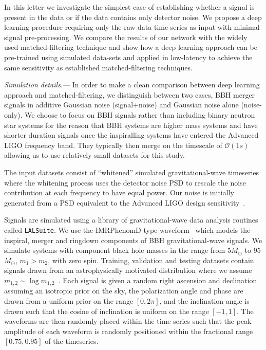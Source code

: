 \documentclass[%
showpacs,
 amsmath,amssymb,
 aps,
 twocolumn,
 prl,
 reprint,
floatfix,
]{revtex4-1}
\begin{document}
%
%
In this letter we investigate the simplest case of establishing whether a
signal is present in the data or if the data contains only detector noise. We
propose a deep learning procedure requiring only the raw data time series as
input with minimal signal pre-processing. We compare the results of our network
with the widely used matched-filtering technique and show how a deep learning
approach can be pre-trained using simulated data-sets and applied in
low-latency to achieve the same sensitivity as established matched-filtering
techniques. 

%
%
\textit{Simulation details.}--- 
%
%
In order to make a clean comparison between deep learning approach and
matched-filtering, we distinguish between two cases, \ac{BBH} merger
signals in additive Gaussian noise (signal+noise) and Gaussian noise alone
(noise-only). We choose to focus on \ac{BBH} signals rather than including
binary neutron star systems for the reason that \ac{BBH} systems are higher
mass systems and have shorter duration signals once the inspiralling systems
have entered the Advanced LIGO frequency band. They typically then merge on the
timescale of $\mathcal{O}(1 s)$ allowing us to use relatively small datasets
for this study. 

%
%
The input datasets consist of ``whitened'' simulated gravitational-wave
timeseries where the whitening process uses the detector noise \ac{PSD} to  
rescale the noise contribution at each frequency to have equal power. 
Our noise is initially generated from a \ac{PSD} equivalent to the Advanced
LIGO design sensitivity~\cite{2016LRR....19....1A}. 

%
%
Signals are simulated using a library of gravitational-wave data analysis
routines called \texttt{LALSuite}. We use the IMRPhenomD type
waveform~\cite{PhysRevD.93.04006, PhysRevD.93.044007} which models the
inspiral, merger and ringdown components of \ac{BBH} gravitational-wave
signals. We simulate systems with component black hole masses in the range from
5\(M_\odot\) to 95\(M_\odot\), $m_{1} > m_{2}$, with zero spin.
Training, validation and testing datasets contain signals drawn from an
astrophysically motivated distribution where we assume
$m_{1,2}\sim\log{m_{1,2}}$~\cite{PhysRevX.6.041015}. Each signal is given a
random right ascension and declination assuming an isotropic prior on the sky,
the polarization angle and phase are drawn from a uniform prior on the range
$[0,2\pi]$, and the inclination angle is drawn such that the cosine of
inclination is uniform on the range $[-1,1]$. The waveforms are then randomly
placed within the time series such that the peak amplitude of each waveform is
randomly positioned within the fractional range $[0.75,0.95]$ of the
timeseries. 
\end{document}

